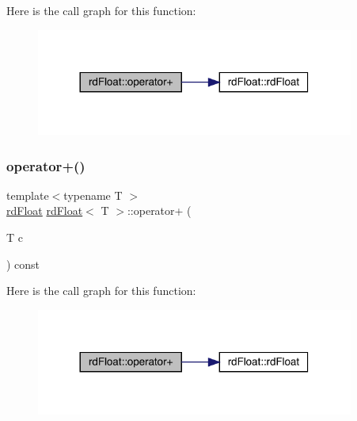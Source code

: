 Here is the call graph for this function\+:\nopagebreak
\begin{figure}[H]
\begin{center}
\leavevmode
\includegraphics[width=296pt]{structrd_float_af07b27de8e50f1b671ff7da8d5cc1bfe_cgraph}
\end{center}
\end{figure}
\mbox{\label{structrd_float_a4132e976df50fd87a522669462e4e074}} 
\subsubsection{\texorpdfstring{operator+()}{operator+()}\hspace{0.1cm}{\footnotesize\ttfamily [2/2]}}
{\footnotesize\ttfamily template$<$typename T $>$ \\
\mbox{\hyperlink{structrd_float}{rd\+Float}} \mbox{\hyperlink{structrd_float}{rd\+Float}}$<$ T $>$\+::operator+ (\begin{DoxyParamCaption}\item[{T}]{c }\end{DoxyParamCaption}) const\hspace{0.3cm}{\ttfamily [inline]}}

Here is the call graph for this function\+:\nopagebreak
\begin{figure}[H]
\begin{center}
\leavevmode
\includegraphics[width=296pt]{structrd_float_a4132e976df50fd87a522669462e4e074_cgraph}
\end{center}
\end{figure}
\mbox{\label{structrd_float_a042dec8fcad27a109288ea14266c5d0e}} 
